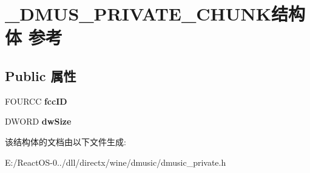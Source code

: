 \hypertarget{struct___d_m_u_s___p_r_i_v_a_t_e___c_h_u_n_k}{}\section{\+\_\+\+D\+M\+U\+S\+\_\+\+P\+R\+I\+V\+A\+T\+E\+\_\+\+C\+H\+U\+N\+K结构体 参考}
\label{struct___d_m_u_s___p_r_i_v_a_t_e___c_h_u_n_k}
\subsection*{Public 属性}
\begin{DoxyCompactItemize}
\item 
\mbox{\label{struct___d_m_u_s___p_r_i_v_a_t_e___c_h_u_n_k_a674703e0fa8eaa203fd039d730644d86}} 
F\+O\+U\+R\+CC {\bfseries fcc\+ID}
\item 
\mbox{\label{struct___d_m_u_s___p_r_i_v_a_t_e___c_h_u_n_k_ae645c923ea1a4da01249076e90a807d7}} 
D\+W\+O\+RD {\bfseries dw\+Size}
\end{DoxyCompactItemize}


该结构体的文档由以下文件生成\+:\begin{DoxyCompactItemize}
\item 
E\+:/\+React\+O\+S-\/0../dll/directx/wine/dmusic/dmusic\+\_\+private.\+h\end{DoxyCompactItemize}
